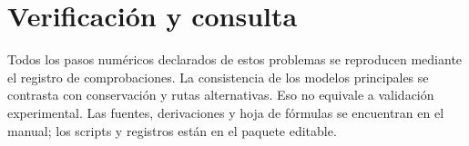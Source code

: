 \section*{Verificación y consulta} Todos los pasos numéricos declarados de estos problemas se reproducen mediante el registro de comprobaciones. La consistencia de los modelos principales se contrasta con conservación y rutas alternativas. Eso no equivale a validación experimental. Las fuentes, derivaciones y hoja de fórmulas se encuentran en el manual; los scripts y registros están en el paquete editable.
